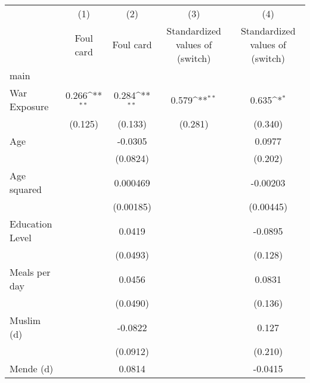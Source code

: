 {
\def\sym#1{\ifmmode^{#1}\else\(^{#1}\)\fi}
\begin{tabular}{l*{4}{c}}
\hline\hline
                    &\multicolumn{1}{c}{(1)}&\multicolumn{1}{c}{(2)}&\multicolumn{1}{c}{(3)}&\multicolumn{1}{c}{(4)}\\
                    &\multicolumn{1}{c}{Foul card}&\multicolumn{1}{c}{Foul card}&\multicolumn{1}{c}{Standardized values of (switch)     }&\multicolumn{1}{c}{Standardized values of (switch)     }\\
\hline
main                &                     &                     &                     &                     \\
War Exposure        &       0.266\sym{**} &       0.284\sym{**} &       0.579\sym{**} &       0.635\sym{*}  \\
                    &     (0.125)         &     (0.133)         &     (0.281)         &     (0.340)         \\
[1em]
Age                 &                     &     -0.0305         &                     &      0.0977         \\
                    &                     &    (0.0824)         &                     &     (0.202)         \\
[1em]
Age squared         &                     &    0.000469         &                     &    -0.00203         \\
                    &                     &   (0.00185)         &                     &   (0.00445)         \\
[1em]
Education Level     &                     &      0.0419         &                     &     -0.0895         \\
                    &                     &    (0.0493)         &                     &     (0.128)         \\
[1em]
Meals per day       &                     &      0.0456         &                     &      0.0831         \\
                    &                     &    (0.0490)         &                     &     (0.136)         \\
[1em]
Muslim (d)          &                     &     -0.0822         &                     &       0.127         \\
                    &                     &    (0.0912)         &                     &     (0.210)         \\
[1em]
Mende (d)           &                     &      0.0814         &                     &     -0.0415         \\

\end{tabular}}
